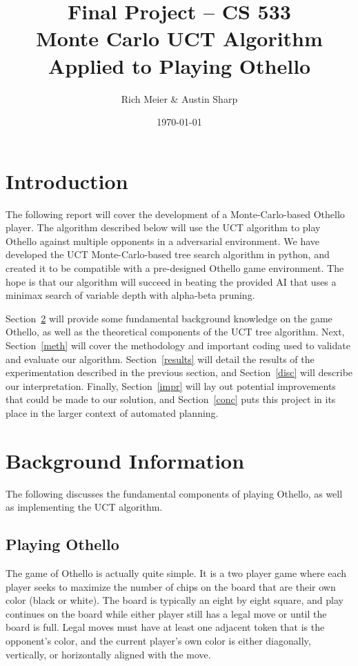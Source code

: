 \documentclass[12pt,letterpaper]{article}
\begin{document}
\title{\vspace{-1in}Final Project -- CS 533 \\ Monte Carlo UCT Algorithm Applied to Playing Othello}
\author{Rich Meier \& Austin Sharp}
\date{\today}
\maketitle

\vspace{-.5in}
\section{Introduction}
The following report will cover the development of a Monte-Carlo-based Othello player. The algorithm described below will use the UCT algorithm to play Othello against multiple opponents in a adversarial environment. We have developed the UCT Monte-Carlo-based tree search algorithm in python, and created it to be compatible with a pre-designed Othello game environment. The hope is that our algorithm will succeed in beating the provided AI that uses a minimax search of variable depth with alpha-beta pruning.

Section~\ref{back} will provide some fundamental background knowledge on the game Othello, as well as the theoretical components of the UCT tree algorithm.  Next, Section~\ref{meth} will cover the methodology and important coding used to validate and evaluate our algorithm. Section~\ref{results} will detail the results of the experimentation described in the previous section, and Section~\ref{disc} will describe our interpretation. Finally, Section~\ref{impr} will lay out potential improvements that could be made to our solution, and Section~\ref{conc} puts this project in its place in the larger context of automated planning.

\section{Background Information}
\label{back}

The following discusses the fundamental components of playing Othello, as well as implementing the UCT algorithm.

\subsection{Playing Othello}

The game of Othello is actually quite simple. It is a two player game where each player seeks to maximize the number of chips on the board that are their own color (black or white). The board is typically an eight by eight square, and play continues on the board while either player still has a legal move or until the board is full. Legal moves must have at least one adjacent token that is the opponent's color, and the current player's own color is either diagonally, vertically, or horizontally aligned with the move.  
\end{document}
